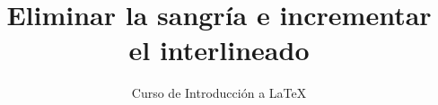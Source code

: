 \documentclass[10pt,letterpaper]{article}
\title{Eliminar la sangría e incrementar el interlineado}
\author{Curso de Introducción a LaTeX}
\begin{document}
	\maketitle
	\lipsum
\end{document}
